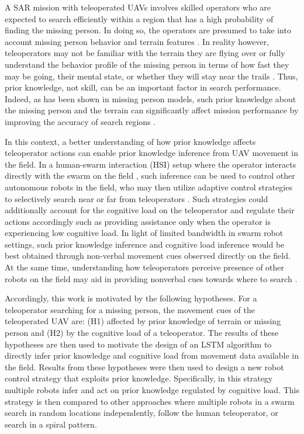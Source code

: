 \documentclass{article}
\begin{document}
A SAR mission with teleoperated UAVs involves skilled operators who are expected to search efficiently within a region that has a high probability of finding the missing person. In doing so, the operators are presumed to take into account missing person behavior and terrain features \cite{niedzielski2018real, koester2008lost}. In reality however, teleoperators may not be familiar with the terrain they are flying over \cite{burke2004moonlight} or fully understand the behavior profile of the missing person in terms of how fast they may be going, their mental state, or whether they will stay near the trails \cite{syrotuck2000}. Thus, prior knowledge, not skill, can be an important factor in search performance. Indeed, as has been shown in missing person models, such prior knowledge about the missing person and the terrain can significantly affect mission performance by improving the accuracy of search regions \cite{lin2010bayesian,hashimoto2022agent}.
	
In this context, a better understanding of how prior knowledge affects teleoperator actions can enable prior knowledge inference from UAV movement in the field. In a human-swarm interaction (HSI) setup where the operator interacts directly with the swarm on the field \cite{kolling2015human}, such inference can be used to control other autonomous robots in the field, who may then utilize adaptive control strategies to selectively search near or far from teleoperators \cite{krzysiak2021information}. Such strategies could additionally account for the cognitive load on the teleoperator and regulate their actions accordingly such as providing assistance only when the operator is experiencing low cognitive load. In light of limited bandwidth in swarm robot settings, such prior knowledge inference and cognitive load inference would be best obtained through non-verbal movement cues observed directly on the field. At the same time, understanding how teleoperators perceive presence of other robots on the field may aid in providing nonverbal cues towards where to search \cite{st2019collective, santos2021motions}. 

Accordingly, this work is motivated by the following hypotheses. For a teleoperator searching for a missing person, the movement cues of the teleoperated UAV are: (H1)  affected by prior knowledge of terrain or missing person and (H2) by the cognitive load of a teleoperator. The results of these hypotheses are then used to motivate the design of an LSTM algorithm to directly infer prior knowledge and cognitive load from movement data available in the field. Results from these hypotheses were then used to design a new robot control strategy that exploits prior knowledge. Specifically, in this strategy multiple robots infer and act on prior knowledge regulated by cognitive load. This strategy is then compared to other approaches where multiple robots in a swarm search in random locations independently, follow the human teleoperator, or search in a spiral pattern.  
\end{document}
